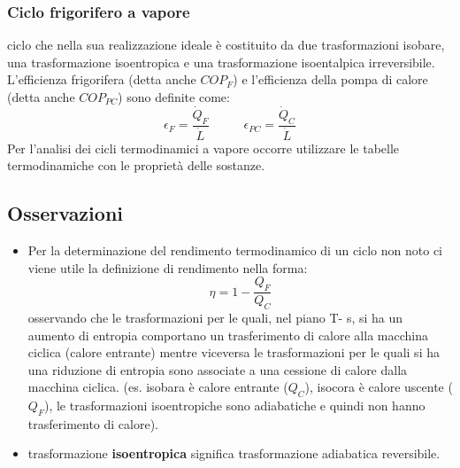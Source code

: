 \subsubsection{Ciclo frigorifero a vapore}
ciclo che nella sua realizzazione ideale è costituito da due
trasformazioni isobare, una trasformazione isoentropica e una trasformazione isoentalpica
irreversibile. \newline
L'efficienza frigorifera (detta anche $COP_F$) e l'efficienza della pompa di calore (detta anche $COP_{PC}$) sono definite come:
\[
    \epsilon_F = \frac{\dot{Q}_F}{\dot{L}} \;\;\;\;\;\;\;\;\;\;\epsilon_{PC} = \frac{\dot{Q}_C}{\dot{L}}
\]
Per l'analisi dei cicli termodinamici a vapore occorre utilizzare le tabelle termodinamiche con le proprietà delle sostanze.
\subsection{Osservazioni}
\begin{itemize}
    \item Per la determinazione del rendimento termodinamico di un ciclo non noto ci viene utile la definizione di rendimento nella forma:
    \[
        \eta = 1- \frac{Q_F}{Q_C}
    \]
    osservando che le trasformazioni per le quali, nel piano T- s, si ha un aumento di entropia
    comportano un trasferimento di calore alla macchina ciclica (calore entrante) mentre
    viceversa le trasformazioni per le quali si ha una riduzione di entropia sono associate a una
    cessione di calore dalla macchina ciclica. (es. isobara è calore entrante ($Q_C$), isocora è calore uscente ($Q_F$), le trasformazioni isoentropiche sono adiabatiche e quindi non hanno trasferimento di calore).
    \item  trasformazione \textbf{isoentropica} significa trasformazione adiabatica reversibile.
\end{itemize}